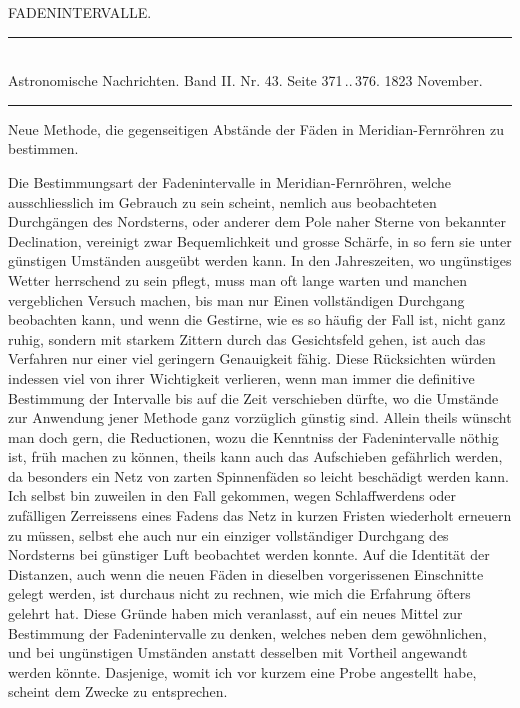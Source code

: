 \clearpage
{}
\hypertarget{native-450-fadenintervalle}{}
\begin{center}
{\large FADENINTERVALLE.}
\end{center}

\begin{center}
\rule{0.5\linewidth}{0.4pt}\\[2pt]
Astronomische Nachrichten. Band II. Nr. 43. Seite 371\,..\,376. 1823 November.\\[2pt]
\rule{0.5\linewidth}{0.4pt}
\end{center}

\begin{center}
Neue Methode, die gegenseitigen Abstände der Fäden in Meridian-Fernröhren zu bestimmen.
\end{center}

Die Bestimmungsart der Fadenintervalle in Meridian-Fernröhren, welche ausschliesslich im Gebrauch zu
sein scheint, nemlich aus beobachteten Durchgängen des Nordsterns, oder anderer dem Pole
%
naher Sterne von bekannter Declination, vereinigt zwar Bequemlichkeit und grosse Schärfe, in so fern
sie unter günstigen Umständen ausgeübt werden kann. In den Jahreszeiten, wo ungünstiges Wetter
herrschend zu sein pflegt, muss man oft lange warten und manchen vergeblichen Versuch machen, bis
man nur Einen vollständigen Durchgang beobachten kann, und wenn die Gestirne, wie es so häufig der
Fall ist, nicht ganz ruhig, sondern mit starkem Zittern durch das Gesichtsfeld gehen, ist auch das
Verfahren nur einer viel geringern Genauigkeit fähig. Diese Rücksichten würden indessen viel von
ihrer Wichtigkeit verlieren, wenn man immer die definitive Bestimmung der Intervalle bis auf die Zeit
verschieben dürfte, wo die Umstände zur Anwendung jener Methode ganz vorzüglich günstig sind. Allein
theils wünscht man doch gern, die Reductionen, wozu die Kenntniss der Fadenintervalle nöthig ist, früh
machen zu können, theils kann auch das Aufschieben gefährlich werden, da besonders ein Netz von
zarten Spinnenfäden so leicht beschädigt werden kann. Ich selbst bin zuweilen in den Fall gekommen,
wegen Schlaffwerdens oder zufälligen Zerreissens eines Fadens das Netz in kurzen Fristen wiederholt
erneuern zu müssen, selbst ehe auch nur ein einziger vollständiger Durchgang des Nordsterns bei
günstiger Luft beobachtet werden konnte. Auf die Identität der Distanzen, auch wenn die neuen Fäden
in dieselben vorgerissenen Einschnitte gelegt werden, ist durchaus nicht zu rechnen, wie mich die
Erfahrung öfters gelehrt hat. Diese Gründe haben mich veranlasst, auf ein neues Mittel zur Bestimmung
der Fadenintervalle zu denken, welches neben dem gewöhnlichen, und bei ungünstigen Umständen anstatt
desselben mit Vortheil angewandt werden könnte. Dasjenige, womit ich vor kurzem eine Probe angestellt
habe, scheint dem Zwecke zu entsprechen.

